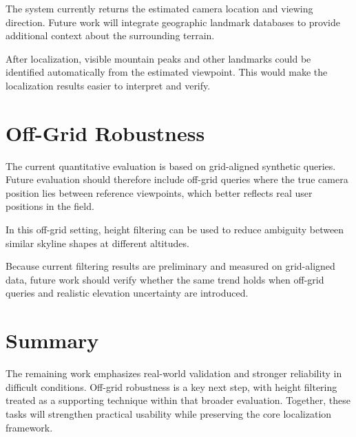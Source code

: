 The system currently returns the estimated camera location and viewing direction. Future work will integrate geographic landmark databases to provide additional context about the surrounding terrain.

After localization, visible mountain peaks and other landmarks could be identified automatically from the estimated viewpoint. This would make the localization results easier to interpret and verify.

\section{Off-Grid Robustness}

The current quantitative evaluation is based on grid-aligned synthetic queries. Future evaluation should therefore include off-grid queries where the true camera position lies between reference viewpoints, which better reflects real user positions in the field.

In this off-grid setting, height filtering can be used to reduce ambiguity between similar skyline shapes at different altitudes.

Because current filtering results are preliminary and measured on grid-aligned data, future work should verify whether the same trend holds when off-grid queries and realistic elevation uncertainty are introduced.

\section{Summary}

The remaining work emphasizes real-world validation and stronger reliability in difficult conditions. Off-grid robustness is a key next step, with height filtering treated as a supporting technique within that broader evaluation. Together, these tasks will strengthen practical usability while preserving the core localization framework.
